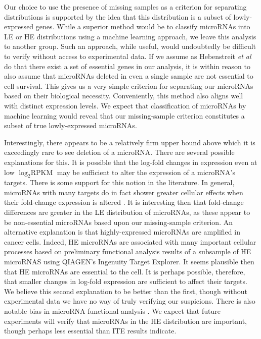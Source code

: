 \documentclass[12pt]{report}
\begin{document}
  Our choice to use the presence of missing samples as a criterion for 
  separating distributions is supported by the idea that this distribution is a 
  subset of lowly-expressed genes. While a superior method would be to classify 
  microRNAs into LE or HE distributions using a machine learning approach, we 
  leave this analysis to another group. Such an approach, while useful, would 
  undoubtedly be difficult to verify without access to experimental data. If we 
  assume as Hebenstreit \emph{et al} do that there exist a set of essential 
  genes in our analysis, it is within reason to also assume that microRNAs deleted in 
  even a single sample are not essential to cell survival. This gives us a very 
  simple criterion for separating our microRNAs based on their biological 
  necessity. Conveniently, this method also aligns well with distinct expression 
  levels. We expect that classification of microRNAs by machine learning would 
  reveal that our missing-sample criterion constitutes a subset of true 
  lowly-expressed microRNAs.
    
  Interestingly, there appears to be a 
  relatively firm upper bound above which it is exceedingly rare to see deletion 
  of a microRNA. There are several possible explanations for this. It is 
  possible that the log-fold changes in expression even at low $\log_{2} \text{RPKM}$ 
  may be sufficient to alter the expression of a microRNA's targets. There is some support for this
  notion in the literature. In general, microRNAs with many targets do in fact shower greater cellular effects
  when their fold-change expression is altered \cite{Calin2006, Lim2005}. It is 
  interesting then that fold-change differences are greater in the LE 
  distribution of microRNAs, as these appear to be non-essential microRNAs based 
  upon our missing-sample criterion. An alternative explanation is that 
  highly-expressed microRNAs are amplified in cancer cells. Indeed, HE microRNAs are associated with 
  many important cellular processes based on preliminary functional analysis results of a subsample of HE microRNAS using QIAGEN’s Ingenuity Target Explorer. It seems plausible then that 
  HE microRNAs are essential to the cell. It is perhaps possible, therefore, 
  that smaller changes in log-fold expression are sufficient to affect their 
  targets. We believe this second explanation to be better than the first, 
  though without experimental data we have no way of truly verifying our 
  suspicions. There is also notable bias in microRNA functional analysis 
  \cite{Bleazard2015}. We expect that future experiments will verify that 
  microRNAs in the HE distribution are important, though perhaps less essential 
  than ITE results indicate.
  
\end{document}
